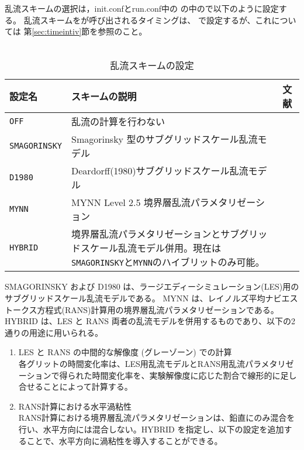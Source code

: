 乱流スキームの選択は，init.confとrun.conf中の
の中ので以下のように設定する。
乱流スキームをが呼び出されるタイミングは、
で設定するが、これについては
第\ref{sec:timeintiv}節を参照のこと。\\

\\

\begin{table}[h]
\begin{center}
  \caption{乱流スキームの設定}
  \label{tab:nml_atm_tb}
  \begin{tabularx}{150mm}{lXX} \hline
    \rowcolor[gray]{0.9}  設定名 & スキームの説明 & 文献\\ \hline
      \verb|OFF|          & 乱流の計算を行わない &  \\
      \verb|SMAGORINSKY|  & Smagorinsky 型のサブグリッドスケール乱流モデル & \citet{smagorinsky_1963,lilly_1962,Brown_etal_1994,Scotti_1993} \\
      \verb|D1980|        & Deardorff(1980)サブグリッドスケール乱流モデル & \citet{Deardorff_1980} \\
      \verb|MYNN|         & MYNN Level 2.5 境界層乱流パラメタリゼーション & \citet{my_1982,nakanishi_2004} \\
      \verb|HYBRID|       & 境界層乱流パラメタリゼーションとサブグリッドスケール乱流モデル併用。現在は\verb|SMAGORINSKY|と\verb|MYNN|のハイブリットのみ可能。 & \\
    \hline
  \end{tabularx}
\end{center}
\end{table}

SMAGORINSKY および D1980 は、ラージエディーシミュレーション(LES)用のサブグリッドスケール乱流モデルである。
MYNN は、レイノルズ平均ナビエストークス方程式(RANS)計算用の境界層乱流パラメタリゼーションである。
HYBRID は、LES と RANS 両者の乱流モデルを併用するものであり、以下の2通りの用途に用いられる。
\begin{enumerate}
\item LES と RANS の中間的な解像度 (グレーゾーン) での計算\\
  各グリットの時間変化率は、LES用乱流モデルとRANS用乱流パラメタリゼーションで得られた時間変化率を、実験解像度に応じた割合で線形的に足し合せることによって計算する。
\item RANS計算における水平渦粘性\\
  RANS計算における境界層乱流パラメタリゼーションは、鉛直にのみ混合を行い、水平方向には混合しない。HYBRID を指定し、以下の設定を追加することで、水平方向に渦粘性を導入することができる。
\end{enumerate}


